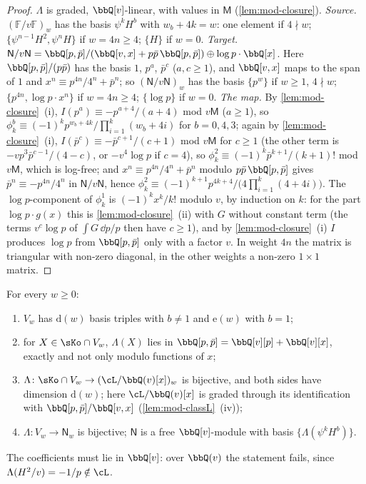 \begin{proof}
$\Lambda$ is graded, $\bbQ[v]$-linear, with values in $\mathsf M$ (\cref{lem:mod-closure}). \emph{Source.} $(\mathbb F/v\mathbb F)_w$ has the basis $\psi^kH^b$ with $w_b+4k=w$: one element if $4\nmid w$; $\{\psi^{n-1}H^2,\psi^nH\}$ if $w=4n\geq 4$; $\{H\}$ if $w=0$. \emph{Target.} $\mathsf N/v\mathsf N=\bbQ[p,\bar p]/(\bbQ[v,x]+p\bar p\,\bbQ[p,\bar p])\oplus\log p\cdot\bbQ[x]$. Here $\bbQ[p,\bar p]/(p\bar p)$ has the basis $1$, $p^a$, $\bar p^c$ ($a,c\geq 1$), and $\bbQ[v,x]$ maps to the span of $1$ and $x^n\equiv p^{4n}/4^n+\bar p^n$; so $(\mathsf N/v\mathsf N)_w$ has the basis $\{p^w\}$ if $w\geq 1$, $4\nmid w$; $\{p^{4n},\log p\cdot x^n\}$ if $w=4n\geq 4$; $\{\log p\}$ if $w=0$. \emph{The map.} By \cref{lem:mod-closure}~(i), $I(p^a)\equiv -p^{a+4}/(a+4)$ mod $v\mathsf M$ ($a\geq 1$), so $\phi^b_k\equiv(-1)^kp^{w_b+4k}/\prod_{i=1}^k(w_b+4i)$ for $b=0,4,3$; again by \cref{lem:mod-closure}~(i), $I(\bar p^c)\equiv-\bar p^{c+1}/(c+1)$ mod $v\mathsf M$ for $c\geq1$ (the other term is $-vp^3\bar p^{c-1}/(4-c)$, or $-v^4\log p$ if $c=4$), so $\phi^2_k\equiv(-1)^k\bar p^{k+1}/(k+1)!$ mod $v\mathsf M$, which is log-free; and $x^n\equiv p^{4n}/4^n+\bar p^n$ modulo $p\bar p\,\bbQ[p,\bar p]$ gives $\bar p^n\equiv-p^{4n}/4^n$ in $\mathsf N/v\mathsf N$, hence $\phi^2_k\equiv(-1)^{k+1}p^{4k+4}/\big(4\prod_{i=1}^k(4+4i)\big)$. The $\log p$-component of $\phi^1_k$ is $(-1)^kx^k/k!$ modulo $v$, by induction on $k$: for the part $\log p\cdot g(x)$ this is \cref{lem:mod-closure}~(ii) with $G$ without constant term (the terms $v^c\log p$ of $\int G\,\dd p/p$ then have $c\geq1$), and by \cref{lem:mod-closure}~(i) $I$ produces $\log p$ from $\bbQ[p,\bar p]$ only with a factor $v$. In weight $4n$ the matrix is triangular with non-zero diagonal, in the other weights a non-zero $1\times 1$ matrix.
\end{proof}

\begin{thm}
\label{thm:mod-lattice}
For every $w\geq 0$:
\begin{enumerate}
\item[(a)] $V_w$ has $\mathrm d(w)$ basis triples with $b\neq 1$ and $\mathrm e(w)$ with $b=1$;
\item[(b)] for $X\in\sKo\cap V_w$, $\Lambda(X)$ lies in $\bbQ[p,\bar p]=\bbQ[v][p]+\bbQ[v][x]$, exactly and not only modulo functions of $x$;
\item[(c)] $\Lambda\colon\sKo\cap V_w\to(\cL/\bbQ(v)[x])_w$ is bijective, and both sides have dimension $\mathrm d(w)$; here $\cL/\bbQ(v)[x]$ is graded through its identification with $\bbQ[p,\bar p]/\bbQ[v,x]$ (\cref{lem:mod-classL}~(iv));
\item[(d)] $\Lambda\colon V_w\to\mathsf N_w$ is bijective; $\mathsf N$ is a free $\bbQ[v]$-module with basis $\{\Lambda(\psi^kH^b)\}$.
\end{enumerate}
The coefficients must lie in $\bbQ[v]$: over $\bbQ(v)$ the statement fails, since $\Lambda(H^2/v)=-1/p\notin\cL$.
\end{thm}

